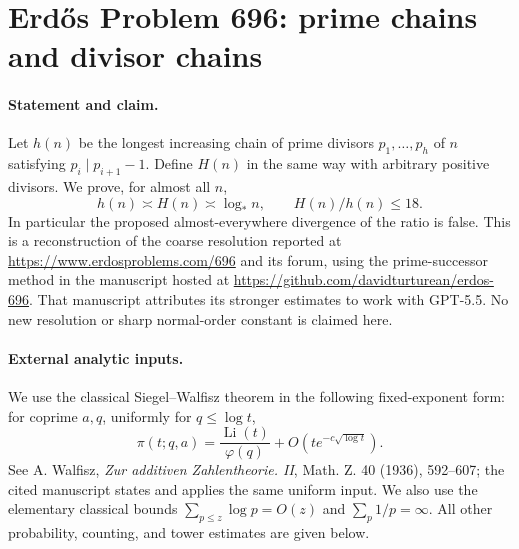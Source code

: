 \section*{Erd\H{o}s Problem 696: prime chains and divisor chains}

\paragraph{Statement and claim.}
Let \(h(n)\) be the longest increasing chain of prime divisors
\(p_1,\ldots,p_h\) of \(n\) satisfying \(p_i\mid p_{i+1}-1\).
Define \(H(n)\) in the same way with arbitrary positive divisors.
We prove, for almost all \(n\),
\[
 h(n)\asymp H(n)\asymp\log_* n,\qquad H(n)/h(n)\leq18.
                                                               \tag{1}
\]
In particular the proposed almost-everywhere divergence of the
ratio is false. This is a reconstruction of the coarse resolution
reported at \url{https://www.erdosproblems.com/696} and its forum,
using the prime-successor method in the manuscript hosted at
\url{https://github.com/davidturturean/erdos-696}.
That manuscript attributes its stronger estimates to work with
GPT-5.5. No new resolution or sharp normal-order constant is
claimed here.

\paragraph{External analytic inputs.}
We use the classical Siegel--Walfisz theorem in the following
fixed-exponent form: for coprime \(a,q\), uniformly for
\(q\leq\log t\),
\[
 \pi(t;q,a)=\frac{\operatorname{Li}(t)}{\varphi(q)}
             +O(t e^{-c\sqrt{\log t}}).                         \tag{2}
\]
See A. Walfisz, \emph{Zur additiven Zahlentheorie. II},
Math. Z. 40 (1936), 592--607; the cited manuscript states
and applies the same uniform input.
We also use the elementary classical bounds
\(\sum_{p\leq z}\log p=O(z)\) and
\(\sum_p1/p=\infty\).
All other probability, counting, and tower estimates are given below.

